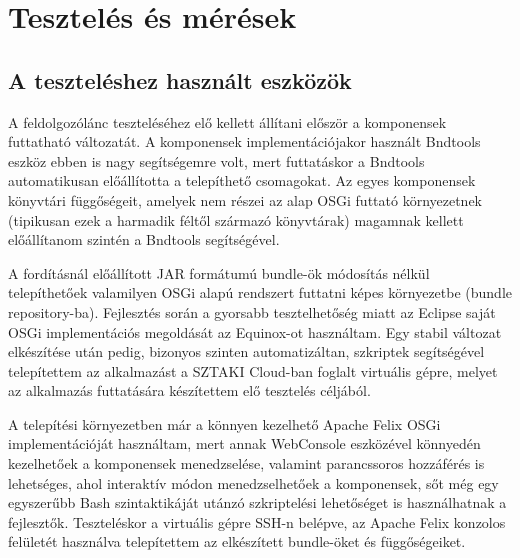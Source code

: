 \chapter{Tesztelés és mérések}
\label{cha:test}

\section{A teszteléshez használt eszközök}
\label{sec:testtools}

A feldolgozólánc teszteléséhez elő kellett állítani először a komponensek futtatható változatát. A komponensek implementációjakor használt Bndtools eszköz ebben is nagy segítségemre volt, mert futtatáskor a Bndtools automatikusan előállította a telepíthető csomagokat. Az egyes komponensek könyvtári függőségeit, amelyek nem részei az alap OSGi futtató környezetnek (tipikusan ezek a harmadik féltől származó könyvtárak) magamnak kellett előállítanom szintén a Bndtools segítségével.

A fordításnál előállított JAR formátumú bundle-ök módosítás nélkül telepíthetőek valamilyen OSGi alapú rendszert futtatni képes környezetbe (bundle repository-ba). Fejlesztés során a gyorsabb tesztelhetőség miatt az Eclipse saját OSGi implementációs megoldását az Equinox-ot használtam. Egy stabil változat elkészítése után pedig, bizonyos szinten automatizáltan, szkriptek segítségével telepítettem az alkalmazást a SZTAKI Cloud-ban foglalt virtuális gépre, melyet az alkalmazás futtatására készítettem elő tesztelés céljából.

A telepítési környezetben már a könnyen kezelhető Apache Felix \cite{apachefelix} OSGi implementációját használtam, mert annak WebConsole eszközével könnyedén kezelhetőek a komponensek menedzselése, valamint parancssoros hozzáférés is lehetséges, ahol interaktív módon menedzselhetőek a komponensek, sőt még egy egyszerűbb Bash szintaktikáját utánzó szkriptelési lehetőséget is használhatnak a fejlesztők. Teszteléskor a virtuális gépre SSH-n belépve, az Apache Felix konzolos felületét használva telepítettem az elkészített bundle-öket és függőségeiket.

